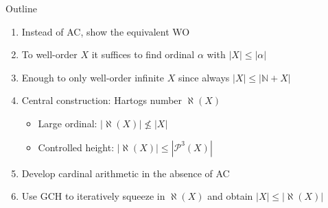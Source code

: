 \documentclass[xcolor=dvipsnames,compress,aspectratio=169,handout]{beamer}
\newcommand{\MBB}[1]{\ensuremath{\mathbb{#1}}\xspace}  %
\newcommand{\MCL}[1]{\ensuremath{\mathcal{#1}}\xspace} %
\newcommand{\Nat}{\MBB{N}}   %
\newcommand{\Pow}{\MCL P}
\newcommand{\hartogsNumber}{\aleph}
\begin{document}
\begin{frame}{Outline}
	\begin{enumerate}[<+->]
			\item
			Instead of AC, show the equivalent WO
			\vspace{0.4cm}
			\item
			To well-order $X$ it suffices to find ordinal $\alpha$ with $|X|\le |\alpha|$
			\vspace{0.4cm}
			\item
			Enough to only well-order infinite $X$ since always $|X|\le|\Nat + X|$
			\vspace{0.4cm}
			\item
			Central construction: Hartogs number $\hartogsNumber(X)$
			\begin{itemize}
				\item
				\vspace{0.2cm}
				Large ordinal: $|\hartogsNumber(X)|\not\le |X|$
				\vspace{0.2cm}
				\item
				Controlled height: $|\hartogsNumber(X)|\le|\Pow^3(X)|$
			\end{itemize}
			\vspace{0.4cm}
			\item
			Develop cardinal arithmetic in the absence of AC
			\vspace{0.4cm}
			\item
			Use GCH to iteratively squeeze in $\hartogsNumber(X)$ and obtain $|X|\le |\hartogsNumber(X)|$
		\end{enumerate}
\end{frame}
\end{document}
